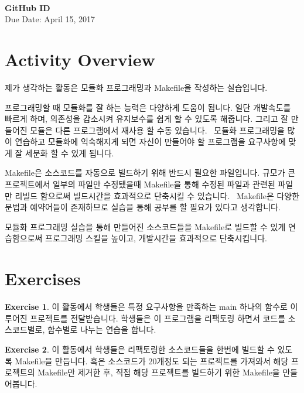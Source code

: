 \documentclass[a4paper, 11pt]{article}
\theoremstyle{definition}
\newtheorem{exercise}{Exercise}
\begin{document}
 \\
         {\phantom{} \hfill \textbf{GitHub ID}} \\
         {\phantom{} \hfill Due Date: April 15, 2017} \\

\section{Activity Overview}

제가 생각하는 활동은 모듈화 프로그래밍과 Makefile을 작성하는 실습입니다.

프로그래밍할 때 모듈화를 잘 하는 능력은 다양하게 도움이 됩니다.
일단 개발속도를 빠르게 하며, 의존성을 감소시켜 유지보수를 쉽게 할 수 있도록 해줍니다.
그리고 잘 만들어진 모듈은 다른 프로그램에서 재사용 할 수동 있습니다.~\cite{modularprogramming}
모듈화 프로그래밍을 많이 연습하고 모듈화에 익숙해지게 되면 자신이 만들어야 할 프로그램을 요구사항에 맞게 잘 세분화 할 수 있게 됩니다.

Makefile은 소스코드를 자동으로 빌드하기 위해 반드시 필요한 파일입니다.
규모가 큰 프로젝트에서 일부의 파일만 수정됐을때 Makefile을 통해 수정된 파일과
관련된 파일만 리빌드 함으로써 빌드시간을 효과적으로 단축시킬 수 있습니다.~\cite{makefilewiki}
Makefile은 다양한 문법과 예약어들이 존재하므로 실습을 통해 공부를 할 필요가 있다고 생각합니다.

모듈화 프로그래밍 실습을 통해 만들어진 소스코드들을 Makefile로 빌드할 수 있게 연습함으로써 
프로그래밍 스킬을 높이고, 개발시간을 효과적으로 단축시킵니다.

\section{Exercises}

\begin{exercise}

  이 활동에서 학생들은 특정 요구사항을 만족하는 main 하나의 함수로 이루어진 프로젝트를 전달받습니다.
학생들은 이 프로그램을 리팩토링 하면서 코드를 소스코드별로, 함수별로 나누는 연습을 합니다.

\end{exercise}

\begin{exercise}

  이 활동에서 학생들은 리팩토링한 소스코드들을 한번에 빌드할 수 있도록 Makefile을 만듭니다.
혹은 소스코드가 20개정도 되는 프로젝트를 가져와서 해당 프로젝트의 Makefile만 제거한 후,
직접 해당 프로젝트를 빌드하기 위한 Makefile을 만들어봅니다.

\end{exercise}
\end{document}

